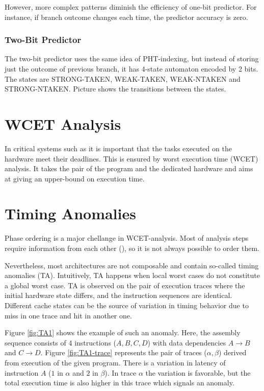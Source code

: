 However, more complex patterns diminish the efficiency of one-bit predictor. For instance, if branch outcome changes each time, the predictor accuracy is zero.

\subsubsection{Two-Bit Predictor}

The two-bit predictor uses the same idea of PHT-indexing, but instead of storing just the outcome of previous branch, it has 4-state automaton encoded by 2 bits. The states are STRONG-TAKEN, WEAK-TAKEN, WEAK-NTAKEN and STRONG-NTAKEN. Picture \TODO{} shows the transitions between the states.




\section{WCET Analysis}

In critical systems such as  it is important that the tasks executed on the hardware meet their deadlines. This is ensured by worst execution time (WCET) analysis. It takes the pair of the program and the dedicated hardware and aims at giving an upper-bound on execution time. 


\section{Timing Anomalies}

Phase ordering is a major chellange in WCET-analysis. Most of analysis steps require information from each other (), so it is not always possible to order them. 

Nevertheless, most architectures are not composable and contain so-called timing anomalies (TA). Intuitively, TA happens when local worst cases do not constitute a global worst case. TA is observed on the pair of execution traces where the initial hardware state differs, and the instruction sequences are identical. Different cache states can be the source of variation in timing behavior due to miss in one trace and hit in another one.

Figure \ref{fig:TA1} shows the example of such an anomaly. Here, the assembly sequence consists of 4 instructions ($A,B,C,D$) with data dependencies $A \rightarrow B$ and $C \rightarrow D$. Figure \ref{fig:TA1-trace} represents the pair of traces ($\alpha, \beta$) derived from execution of the given program. There is a variation in latency of instruction $A$ ($1$ in $\alpha$ and $2$ in $\beta$). In trace $\alpha$  the variation is favorable, but the total execution time is also higher in this trace which signals an anomaly.


